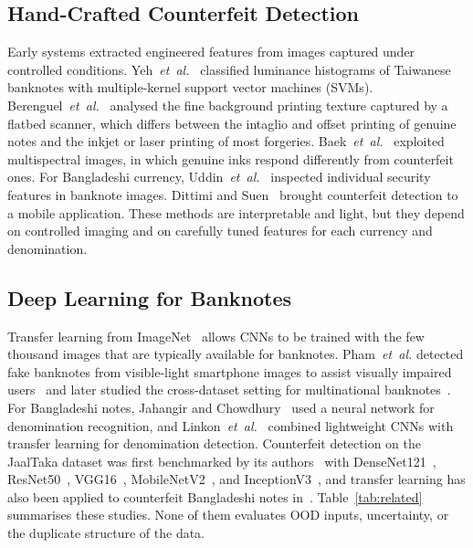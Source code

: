 \documentclass[journal]{IEEEtran}
\begin{document}
\subsection{Hand-Crafted Counterfeit Detection}
Early systems extracted engineered features from images captured under controlled
conditions. Yeh~\textit{et~al.}~\cite{yeh2011} classified luminance histograms of
Taiwanese banknotes with multiple-kernel support vector machines (SVMs).
Berenguel~\textit{et~al.}~\cite{berenguel2016} analysed the fine background printing
texture captured by a flatbed scanner, which differs between the intaglio and offset
printing of genuine notes and the inkjet or laser printing of most forgeries.
Baek~\textit{et~al.}~\cite{baek2018} exploited multispectral images, in which genuine
inks respond differently from counterfeit ones. For Bangladeshi currency,
Uddin~\textit{et~al.}~\cite{uddin2016} inspected individual security features in
banknote images. Dittimi and Suen~\cite{dittimi2018} brought counterfeit detection to a
mobile application. These methods are interpretable and light, but they depend on
controlled imaging and on carefully tuned features for each currency and denomination.

\subsection{Deep Learning for Banknotes}
Transfer learning from ImageNet~\cite{deng2009imagenet,yosinski2014transferable}
allows CNNs to be trained with the few thousand images that are typically available for
banknotes. Pham~\textit{et~al.} detected fake banknotes from visible-light smartphone
images to assist visually impaired users~\cite{pham2020} and later studied the
cross-dataset setting for multinational banknotes~\cite{pham2022}. For Bangladeshi notes,
Jahangir and Chowdhury~\cite{jahangir2007} used a neural network for denomination
recognition, and Linkon~\textit{et~al.}~\cite{linkon2020} combined lightweight CNNs with
transfer learning for denomination detection. Counterfeit detection on the JaalTaka
dataset was first benchmarked by its authors~\cite{piyas2025jaaltaka} with
DenseNet121~\cite{huang2017densenet}, ResNet50~\cite{he2016resnet},
VGG16~\cite{simonyan2015vgg}, MobileNetV2~\cite{sandler2018mobilenetv2}, and
InceptionV3~\cite{szegedy2016inception}, and transfer learning has also been applied
to counterfeit Bangladeshi notes in~\cite{tabassum2025}. Table~\ref{tab:related}
summarises these studies. None of them evaluates OOD inputs, uncertainty, or the
duplicate structure of the data.
\end{document}
